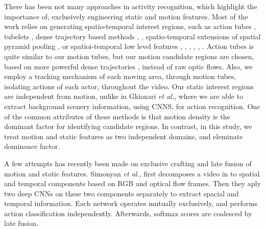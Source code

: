 
There has been not many approaches in activity recognition, which highlight the
importance of, exclusively engineering static and motion features. Most of the work
relies on generating spatio-temporal interest regions, such as action tubes \cite{gkioxari2015finding},
tubelets \cite{jain2014action}, dense trajectory based methods \cite{van2015apt}, \cite{wang2015action},
spatio-temporal extensions of spatial pyramid pooling \cite{laptev2008learning},
or spatioi-temporal low level features  \cite{schuldt2004recognizing}, \cite{ke2005efficient}, \cite{shechtman2005space},
\cite{wang2011action}, \cite{klaser2008spatio}, \cite{yu2010real}. Action tubes \cite{gkioxari2015finding} is quite similar to 
our motion tubes, but our motion candidate regions are chosen, based on more powerful dense trajectories \cite{wang2011action}, instead of
raw optic flows. Also, we employ a tracking mechanism of each moving area, through motion tubes, isolating actions 
of each actor, throughout the video. Our static interest regions are independent from motion,
unlike in Gkioxari \textit{et al.}\cite{gkioxari2015finding}, where we are able to extract background scenery information, using CNNS, for 
action recognition. 
One of the common attributes of these methods is that motion density is the 
dominant factor for identifying candidate regions. 
In contrast, in this study, we treat motion and static features 
as two independent domains, and eleminate dominance factor. 

A few attempts has recently been made on exclusive crafting and late fusion 
of motion and static features. Simonyan \textit{et al.}\cite{simonyan2014two}, first decomposes a video in to 
spatial and temporal components based on RGB and optical flow frames.
Then they aply two deep CNNs on these two components separately to extract spacial and 
temporal information. Each network operates mutually exclusively, and performs action classification
independently. Afterwards, softmax scores are coalesced by late fusion. 


